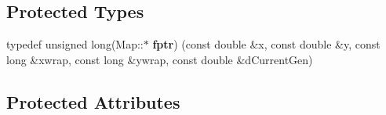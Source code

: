 \subsection*{Protected Types}
\begin{DoxyCompactItemize}
\item 
typedef unsigned long(Map\+::$\ast$ {\bfseries fptr}) (const double \&x, const double \&y, const long \&xwrap, const long \&ywrap, const double \&d\+Current\+Gen)\hypertarget{class_map_a0080b09c39d18cad51d83d5ec2bc2ce7}{}\label{class_map_a0080b09c39d18cad51d83d5ec2bc2ce7}

\end{DoxyCompactItemize}
\subsection*{Protected Attributes}
